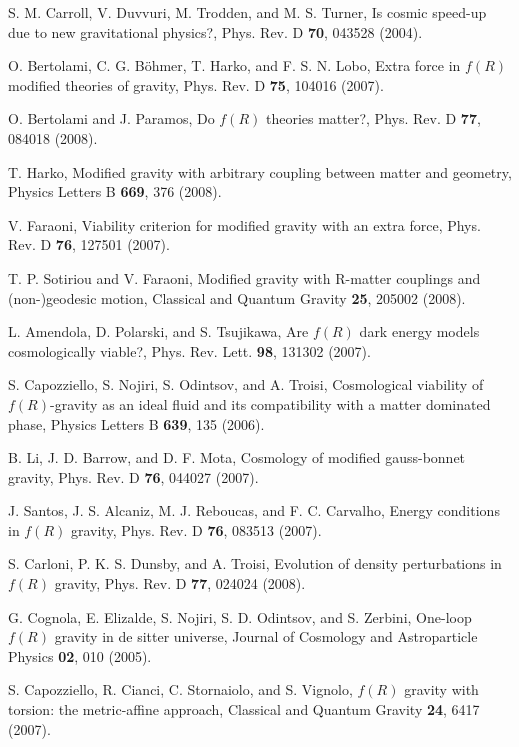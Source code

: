 \begin{thebibliography}{87}
 S. M. Carroll, V. Duvvuri, M. Trodden, and M. S. Turner, Is cosmic speed-up due to new gravitational physics?, Phys. Rev. D
\textbf{70}, 043528 (2004).

O. Bertolami, C. G. B\"ohmer, T. Harko, and F. S. N. Lobo, Extra force in $f(R)$ modified theories of gravity, Phys. Rev. D \textbf{75}, 104016 (2007).

 O. Bertolami and J. Paramos, Do $f(R)$ theories matter?, Phys. Rev. D \textbf{77}, 084018 (2008).

 T. Harko, Modified gravity with arbitrary coupling between matter and geometry, Physics Letters B \textbf{669}, 376 (2008).

 V. Faraoni, Viability criterion for modified gravity with an extra force, Phys. Rev. D \textbf{76}, 127501 (2007).

 T. P. Sotiriou and V. Faraoni, Modified gravity with R-matter couplings and (non-)geodesic motion, Classical and Quantum
Gravity \textbf{25}, 205002 (2008).

L. Amendola, D. Polarski, and S. Tsujikawa, Are $f(R)$ dark energy models cosmologically viable?, Phys. Rev. Lett. \textbf{98}, 131302
(2007).

 S. Capozziello, S. Nojiri, S. Odintsov, and A. Troisi, Cosmological viability of $f(R)$-gravity as an ideal fluid and its compatibility
with a matter dominated phase, Physics Letters B \textbf{639}, 135 (2006).

 B. Li, J. D. Barrow, and D. F. Mota, Cosmology of modified gauss-bonnet gravity, Phys. Rev. D \textbf{76}, 044027 (2007).

 J. Santos, J. S. Alcaniz, M. J. Reboucas, and F. C. Carvalho, Energy conditions in $f(R)$ gravity, Phys. Rev. D \textbf{76}, 083513 (2007).

S. Carloni, P. K. S. Dunsby, and A. Troisi, Evolution of density perturbations in $f(R)$ gravity, Phys. Rev. D \textbf{77}, 024024 (2008).

G. Cognola, E. Elizalde, S. Nojiri, S. D. Odintsov, and S. Zerbini, One-loop $f(R)$ gravity in de sitter universe, Journal of Cosmology
and Astroparticle Physics \textbf{02}, 010 (2005).

S. Capozziello, R. Cianci, C. Stornaiolo, and S. Vignolo, $f(R)$ gravity with torsion: the metric-affine approach, Classical and
Quantum Gravity \textbf{24}, 6417 (2007).


\end{thebibliography}
